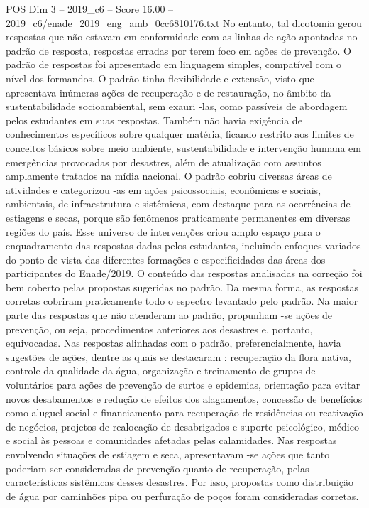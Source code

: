 \begin{textsample}{POS Dim 3 – 2019\_c6 – Score 16.00 – 2019\_c6/enade\_2019\_eng\_amb\_0cc6810176.txt}
No entanto, tal dicotomia gerou respostas que não estavam em conformidade com as linhas de ação apontadas no padrão de resposta, respostas erradas por terem foco em ações de prevenção.
O padrão de respostas foi apresentado em linguagem simples, compatível com o nível dos formandos.
O padrão tinha flexibilidade e extensão, visto que apresentava inúmeras ações de recuperação e de restauração, no âmbito da sustentabilidade socioambiental, sem exauri -las, como passíveis de abordagem pelos estudantes em suas respostas.
Também não havia exigência de conhecimentos específicos sobre qualquer matéria, ficando restrito aos limites de conceitos básicos sobre meio ambiente, sustentabilidade e intervenção humana em emergências provocadas por desastres, além de atualização com assuntos amplamente tratados na mídia nacional.
O padrão cobriu diversas áreas de atividades e categorizou -as em ações psicossociais, econômicas e sociais, ambientais, de infraestrutura e sistêmicas, com destaque para as ocorrências de estiagens e secas, porque são fenômenos praticamente permanentes em diversas regiões do país.
Esse universo de intervenções criou amplo espaço para o enquadramento das respostas dadas pelos estudantes, incluindo enfoques variados do ponto de vista das diferentes formações e especificidades das áreas dos participantes do Enade/2019.
O conteúdo das respostas analisadas na correção foi bem coberto pelas propostas sugeridas no padrão.
Da mesma forma, as respostas corretas cobriram praticamente todo o espectro levantado pelo padrão.
Na maior parte das respostas que não atenderam ao padrão, propunham -se ações de prevenção, ou seja, procedimentos anteriores aos desastres e, portanto, equivocadas.
Nas respostas alinhadas com o padrão, preferencialmente, havia sugestões de ações, dentre as quais se destacaram : recuperação da flora nativa, controle da qualidade da água, organização e treinamento de grupos de voluntários para ações de prevenção de surtos e epidemias, orientação para evitar novos desabamentos e redução de efeitos dos alagamentos, concessão de benefícios como aluguel social e financiamento para recuperação de residências ou reativação de negócios, projetos de realocação de desabrigados e suporte psicológico, médico e social às pessoas e comunidades afetadas pelas calamidades.
Nas respostas envolvendo situações de estiagem e seca, apresentavam -se ações que tanto poderiam ser consideradas de prevenção quanto de recuperação, pelas características sistêmicas desses desastres.
Por isso, propostas como distribuição de água por caminhões pipa ou perfuração de poços foram consideradas corretas.

\end{textsample}
